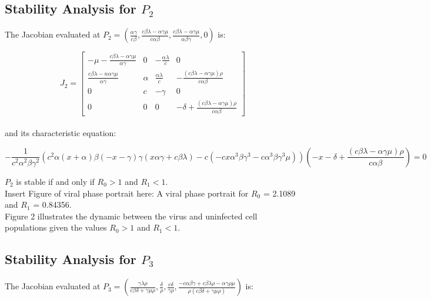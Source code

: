 \documentclass{article}
\begin{document}
\subsection{Stability Analysis for $P_{2}$}

The Jacobian evaluated at $P_{2} = (\frac{\alpha \gamma}{c \beta}, \frac{c  \beta \lambda - \alpha \gamma \mu}{c \alpha \beta}, \frac{c \beta \lambda - \alpha \gamma \mu}{\alpha \beta \gamma}, 0)$ is:

\[J_{2} =
	\begin{bmatrix}
		- \mu - \frac{c \beta \lambda - \alpha \gamma \mu}{\alpha \gamma} & 0 & - \frac{\alpha \lambda}{c} & 0 \\
		\frac{c \beta \lambda - n\alpha \gamma \mu}{\alpha \gamma} & \alpha & \frac{\alpha \lambda}{c} & - \frac{(c \beta \lambda - \alpha \gamma \mu) \rho}{c \alpha \beta} \\
		0 & c & - \gamma & 0 \\
		0 & 0 & 0 & - \delta + \frac{(c \beta \lambda - \alpha \gamma \mu) \rho}{c \alpha \beta}
	\end{bmatrix}
\]\\

and its characteristic equation:

\begin{equation}
	- \frac{1}{c^2 \alpha^2 \beta \gamma^2}(c^2 \alpha(x + \alpha) \beta(-x - \gamma) \gamma(x \alpha \gamma + c \beta \lambda) - c(-cx \alpha^3 \beta \gamma^3 - c \alpha^3 \beta \gamma^3 \mu))(-x - \delta + \frac{(c \beta \lambda - \alpha \gamma \mu)\rho}{c \alpha \beta}) = 0
\end{equation}


$P_{2}$ is stable if and only if $R_{0} > 1$ and $R_{1} < 1$.\\

Insert Figure of viral phase portrait here: A viral phase portrait for $R_{0}$ = 2.1089 and $R_{1}$ = 0.84356.\\
Figure 2 illustrates the dynamic between the virus and uninfected cell populations given the values $R_{0} > 1$ and $R_{1} < 1$.

\subsection{Stability Analysis for $P_{3}$}

The Jacobian evaluated at $P_{3} = (\frac{\gamma \lambda \rho}{c \beta \delta + \gamma \mu \rho}, \frac{\delta}{\rho}, \frac{c \delta}{\gamma \rho}, \frac{-c \alpha \beta \gamma + c \beta \lambda \rho - \alpha \gamma \rho \mu}{\rho (c \beta \delta + \gamma \mu \rho)})$ is:
\end{document}
